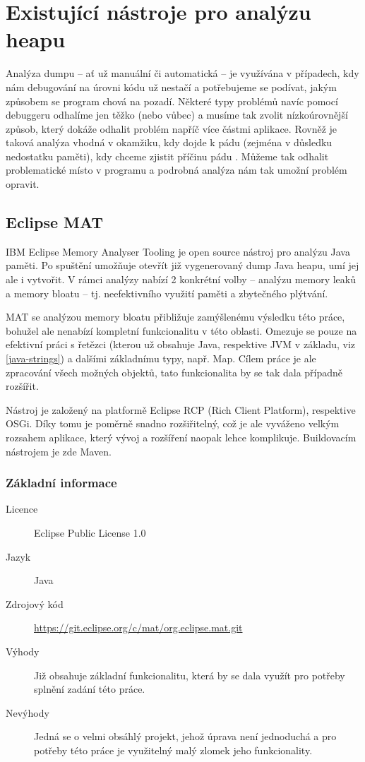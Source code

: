 \chapter{Existující nástroje pro analýzu heapu}
\label{existing-solutions}
Analýza dumpu -- ať už manuální či automatická -- je využívána v případech, kdy nám debugování na úrovni kódu už nestačí a potřebujeme se podívat, jakým způsobem se program chová na pozadí. Některé typy problémů navíc pomocí debuggeru odhalíme jen těžko (nebo vůbec) a musíme tak zvolit nízkoúrovnější způsob, který dokáže odhalit problém napříč více částmi aplikace. Rovněž je taková analýza vhodná v okamžiku, kdy dojde k pádu (zejména v důsledku nedostatku paměti), kdy chceme zjistit příčinu pádu . Můžeme tak odhalit problematické místo v programu a podrobná analýza nám tak umožní problém opravit.

\section{Eclipse MAT}
IBM Eclipse Memory Analyser Tooling je open source nástroj pro analýzu Java paměti. Po spuštění umožňuje otevřít již vygenerovaný dump Java heapu, umí jej ale i vytvořit. V rámci analýzy nabízí 2 konkrétní volby – analýzu memory leaků a memory bloatu – tj. neefektivního využití paměti a zbytečného plýtvání. 

MAT se analýzou memory bloatu přibližuje zamýšlenému výsledku této práce, bohužel ale nenabízí kompletní funkcionalitu v této oblasti. Omezuje se pouze na efektivní práci s řetězci (kterou už obsahuje Java, respektive JVM v základu, viz \ref{java-strings}) a dalšími základnímu typy, např. Map. Cílem práce je ale zpracování všech možných objektů, tato funkcionalita by se tak dala případně rozšířit.

Nástroj je založený na platformě Eclipse RCP (Rich Client Platform), respektive OSGi. Díky tomu je poměrně snadno rozšiřitelný, což je ale vyváženo velkým rozsahem aplikace, který vývoj a rozšíření naopak lehce komplikuje. Buildovacím nástrojem je zde Maven.

\subsection{Základní informace}

\begin{description}
    \item[Licence] Eclipse Public License 1.0
    \item[Jazyk] Java
    \item[Zdrojový kód] \url{https://git.eclipse.org/c/mat/org.eclipse.mat.git} 
    \item[Výhody] Již obsahuje základní funkcionalitu, která by se dala využít pro potřeby splnění zadání této práce.
    \item[Nevýhody] Jedná se o velmi obsáhlý projekt, jehož úprava není jednoduchá a pro potřeby této práce je využitelný malý zlomek jeho funkcionality.
\end{description}

